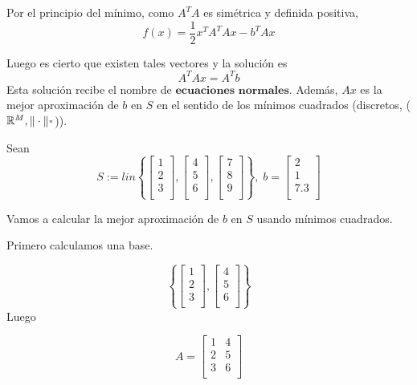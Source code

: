 Por el principio del mínimo, como $A^TA$ es simétrica y definida positiva,
$$ f(x) = \frac{1}{2}x^TA^TAx-b^TAx$$

Luego es cierto que existen tales vectores y la solución es
$$A^TAx = A^Tb$$
Esta solución recibe el nombre de $\textbf{ecuaciones normales}$. Además, $Ax$ es la mejor aproximación de $b$ en $S$ en el sentido de los mínimos cuadrados (discretos, ($\mathbb{R}^M, \Vert \cdot \Vert _"$)).

\begin{ejemplo}
Sean
$$S := lin \left\lbrace \begin{bmatrix}
1 \\
2 \\
3 \\
\end{bmatrix}, 
\begin{bmatrix}
4 \\
5 \\
6 \\
\end{bmatrix},
\begin{bmatrix}
7 \\
8 \\
9 \\
\end{bmatrix}
\right\rbrace
,
\;
b = \begin{bmatrix}
2 \\
1 \\
7.3 \\
\end{bmatrix}$$

Vamos a calcular la mejor aproximación de $b$ en $S$ usando mínimos cuadrados.

Primero calculamos una base.

$$\left\lbrace \begin{bmatrix}
1 \\
2 \\
3 \\
\end{bmatrix}, 
\begin{bmatrix}
4 \\
5 \\
6 \\
\end{bmatrix}
\right\rbrace
$$
Luego 

$$A = \begin{bmatrix}
1 & 4\\
2 & 5\\
3 & 6\\
\end{bmatrix}$$


\end{ejemplo}
